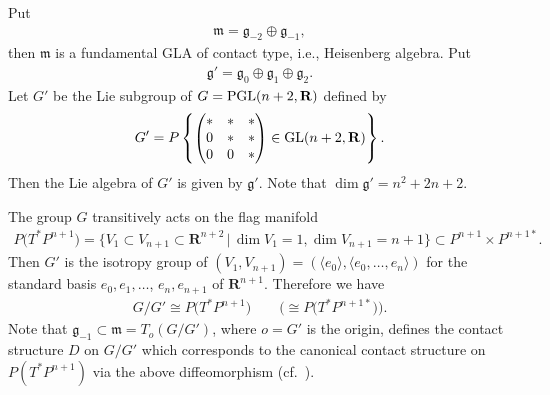 \documentclass[11pt]{article}
\begin{document}
Put
\begin{gather*}
\mathfrak{m}= \mathfrak{g}_{-2}\oplus \mathfrak{g}_{-1},
\end{gather*}
then $\mathfrak{m}$ is a fundamental GLA of contact type, i.e., Heisenberg
algebra.
Put
\begin{gather*}
\mathfrak{g}'=\mathfrak{g}_0 \oplus \mathfrak{g}_1 \oplus
\mathfrak{g}_2.
\end{gather*}
Let $G'$ be the Lie subgroup of $G = {\rm PGL}(n+2, {\mathbf{R}})$ def\/ined by
\begin{gather*}
G' = P\left\{
\begin{pmatrix}
* & * & * \\
0 & * & * \\
0 & 0 & *
\end{pmatrix}
\in
{\rm GL}(n+2, {\mathbf{R}})
\right\}.
\end{gather*}
Then the Lie algebra of $G'$ is given by $\mathfrak{g}'$. Note that
$\dim \mathfrak{g}' = n^2 + 2n + 2$.

The group $G$ transitively acts on the f\/lag manifold
\begin{gather*}
P\big(T^*P^{n+1}\big) = \big\{ V_1 \subset V_{n+1} \subset {\mathbf{R}}^{n+2} \,|\,
\dim V_1 = 1, \dim V_{n+1} = n + 1 \big\} \subset P^{n+1}\times P^{n+1*}.
\end{gather*}
Then $G'$ is the isotropy group of $(V_1, V_{n+1}) = (\langle e_0 \rangle,
\langle e_0, \dots, e_n \rangle)$ for the standard basis $e_0, e_1, \dots$,
$e_n, e_{n+1}$ of ${\mathbf{R}}^{n+1}$.
Therefore we have
\begin{gather*}
G/G' \cong P\big(T^*P^{n+1}\big) \qquad \big(\cong P\big(T^*P^{n+1*}\big)\big).
\end{gather*}
Note that $\mathfrak{g}_{-1} \subset \mathfrak{m} = T_o(G/G')$, where
$o = G'$ is the origin,
def\/ines the contact structure $D$ on $G/G'$ which corresponds to
the canonical contact structure
on $P(T^*P^{n+1})$ via the above dif\/feomorphism (cf.~\cite{I-M}).
\end{document}
